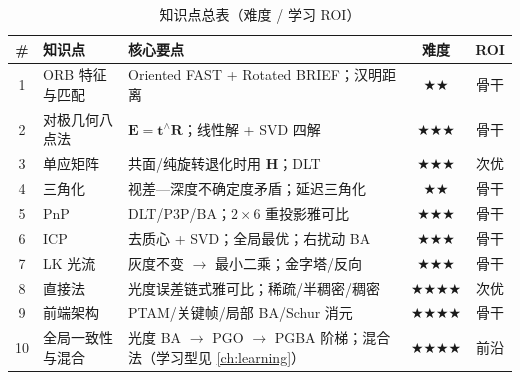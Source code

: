 \begin{table}[H]\centering\small
\caption{知识点总表（难度 / 学习 ROI）}
\begin{tabular}{cllcc}
\toprule
\# & 知识点 & 核心要点 & 难度 & ROI \\
\midrule
1 & ORB 特征与匹配 & Oriented FAST + Rotated BRIEF；汉明距离 & $\bigstar\bigstar$ & 骨干 \\
2 & 对极几何八点法 & $\mathbf{E}=\mathbf{t}^\wedge\mathbf{R}$；线性解 + SVD 四解 & $\bigstar\bigstar\bigstar$ & 骨干 \\
3 & 单应矩阵 & 共面/纯旋转退化时用 $\mathbf{H}$；DLT & $\bigstar\bigstar\bigstar$ & 次优 \\
4 & 三角化 & 视差—深度不确定度矛盾；延迟三角化 & $\bigstar\bigstar$ & 骨干 \\
5 & PnP & DLT/P3P/BA；$2\times6$ 重投影雅可比 & $\bigstar\bigstar\bigstar$ & 骨干 \\
6 & ICP & 去质心 + SVD；全局最优；右扰动 BA & $\bigstar\bigstar\bigstar$ & 骨干 \\
7 & LK 光流 & 灰度不变 $\to$ 最小二乘；金字塔/反向 & $\bigstar\bigstar\bigstar$ & 骨干 \\
8 & 直接法 & 光度误差链式雅可比；稀疏/半稠密/稠密 & $\bigstar\bigstar\bigstar\bigstar$ & 次优 \\
9 & 前端架构 & PTAM/关键帧/局部 BA/Schur 消元 & $\bigstar\bigstar\bigstar\bigstar$ & 骨干 \\
10 & 全局一致性与混合 & 光度 BA $\to$ PGO $\to$ PGBA 阶梯；混合法（学习型见 \cref{ch:learning}）& $\bigstar\bigstar\bigstar\bigstar$ & 前沿 \\
\bottomrule
\end{tabular}
\end{table}

